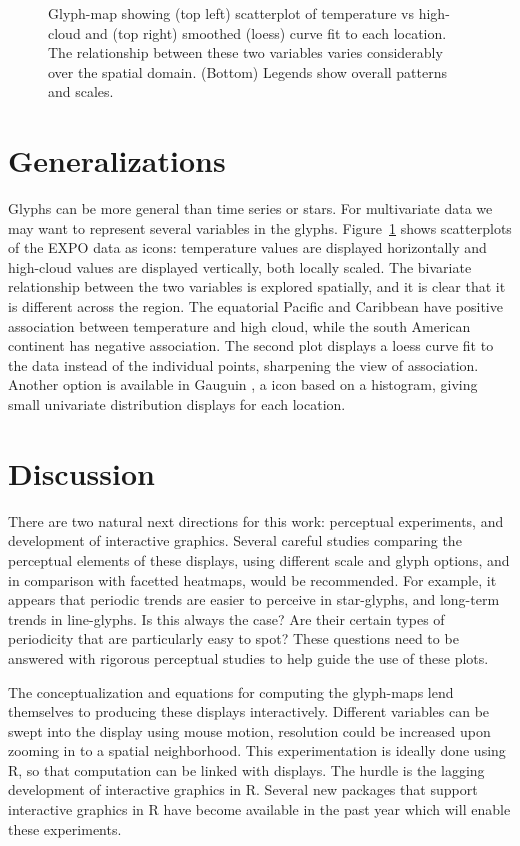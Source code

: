 \documentclass[oneside]{article}
\begin{document}
\begin{figure}[htbp]
  \caption{Glyph-map showing (top left) scatterplot of temperature vs high-cloud and (top right) smoothed (loess) curve fit to each location. The relationship between these two variables varies considerably over the spatial domain. (Bottom) Legends show overall patterns and scales.}
  \label{fig:cloud}
\end{figure}

\section{Generalizations}

Glyphs can be more general than time series or stars. For multivariate data we may want to represent several variables in the glyphs. Figure~\ref{fig:cloud} shows scatterplots of the EXPO data as icons: temperature values are displayed horizontally and high-cloud values are displayed vertically, both locally scaled. The bivariate relationship between the two variables is explored spatially, and it is clear that it is different across the region. The equatorial Pacific and Caribbean have positive association between temperature and high cloud, while the south American continent has negative association. The second plot displays a loess curve fit to the data instead of the individual points, sharpening the view of association. Another option is available in Gauguin \citep{gribov:2006}, a icon based on a histogram, giving small univariate distribution displays for each location.

\section{Discussion}

There are two natural next directions for this work: perceptual experiments, and development of interactive graphics. Several careful studies comparing the perceptual elements of these displays, using different scale and glyph options, and in comparison with facetted heatmaps, would be recommended. For example, it appears that periodic trends are easier to perceive in star-glyphs, and long-term trends in line-glyphs. Is this always the case? Are their certain types of periodicity that are particularly easy to spot? These questions need to be answered with rigorous perceptual studies to help guide the use of these plots.

The conceptualization and equations for computing the glyph-maps lend themselves to producing these displays interactively. Different variables can be swept into the display using mouse motion, resolution could be increased upon zooming in to a spatial neighborhood. This experimentation is ideally done using R, so that computation can be linked with displays. The hurdle is the lagging development of interactive graphics in R. Several new packages that support interactive graphics in R have become available in the past year \citep{qtbase, qtpaint, plumbr} which will enable these experiments.
\end{document}
